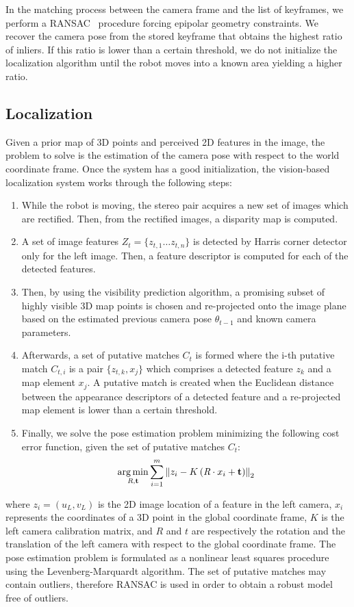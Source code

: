 In the matching process between the camera frame and the list of keyframes, we perform a RANSAC~\cite{Bolles81ijcai} procedure forcing epipolar geometry constraints. We recover the camera pose from the stored keyframe that obtains the highest ratio of inliers. If this ratio is lower than a certain threshold, we do not initialize the localization algorithm until the robot moves into a known area yielding a higher ratio.

\subsection{Localization}
Given a prior map of 3D points and perceived 2D features in the image, the problem to solve is the estimation of the camera pose with respect to the world coordinate frame. Once the system has a good initialization, the vision-based localization system works through the
following steps:
%
\begin{enumerate}
\item While the robot is moving, the stereo pair acquires a new set of images which are rectified. Then, from the rectified images, a disparity map is computed.
\item A set of image features $Z_{t}=\{z_{t,1} \ldots z_{t,n}\}$ is detected by Harris corner detector only for the left image. Then, a feature descriptor is computed for each of the detected features.
\item Then, by using the visibility prediction algorithm, a promising subset of highly visible 3D map points is chosen and re-projected onto the image plane based on the estimated previous camera pose $\theta_{t-1}$ and known camera parameters.
\item Afterwards, a set of putative matches $C_{t}$ is formed where the i-th putative match $C_{t,i}$ is a pair $\{z_{t,k},x_{j}\}$ which comprises a detected feature $z_{k}$ and a map element $x_{j}$. A putative match is created when the Euclidean distance between the appearance descriptors of a detected feature and a re-projected map element is lower than a certain threshold.
\item Finally, we solve the pose estimation problem minimizing the following cost error function, given the set of putative matches $C_{t}$:
%
\begin{equation} \label{eq:pose_estimation}
\argmin \limits_{\emph{R},\mathbf{t}} \sum \limits_{i=1}^{m} \left\|z_{i} - K \left(\emph{R}\cdot x_{i} + \mathbf{t} \right)\right\|_{2}
\end{equation}
%
\end{enumerate}
%
where $z_{i}=\left(u_{L},v_{L}\right)$ is the 2D image location of a feature in the left camera, $x_{i}$ represents the coordinates of a 3D point in the global coordinate frame, $K$ is the left camera calibration matrix, and $R$ and $t$ are respectively the rotation and the translation of the left camera with respect to the global coordinate frame. The pose estimation problem is formulated as a nonlinear least squares procedure using the Levenberg-Marquardt algorithm. The set of putative matches may contain outliers, therefore RANSAC is used in order to obtain a robust model free of outliers.

